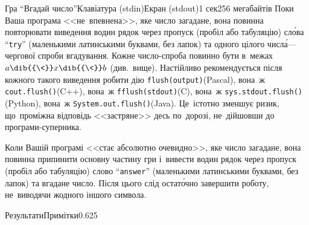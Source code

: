 \begin{problem}{Гра ``Вгадай число''}{Клавіатура (stdin)}{Екран (stdout)}{1 сек}{256 мегабайтів}
\OutputFile
Поки Ваша програма <<не~впевнена>>, яке число загадане,  
вона повинна повторювати виведення 
в\nolinebreak[2] один рядок через пропуск (пробіл або табуляцію) 
сл\'{о}ва ``\texttt{try}'' (маленькими латинськими буквами, без лапок)
та одного цілого числ\'{а}\nolinebreak[3] --- 
чергової спроби вгадування\nolinebreak[3].
Кожне число-спроба повинно бути в~межах $a\dib{{\<}}x\dib{{\<}}b$ (див.~вище).
Настійливо рекомендується після кожного такого виведення 
робити дію \verb"flush(output)"\nolinebreak[2] (Pascal), 
вона~ж \verb"cout.flush()"\nolinebreak[2] (C++), 
вона~ж \verb"fflush(stdout)"\nolinebreak[2] (C), 
вона~ж \verb"sys.stdout.flush()"\nolinebreak[2] (Python),
вона~ж \verb"System.out.flush()"\nolinebreak[2] (Java).
Це~істотно зменшує ризик, 
що~проміжна відповідь <<застряне>> десь по~дорозі, 
не~дійшовши до програми-суперника.

Коли Вашій програмі <<стає абсолютно очевидно>>, яке число загадане,
вона повинна припинити основну частину гри і~вивести 
в\nolinebreak[2] один рядок через пропуск (пробіл або табуляцію) 
слово ``\texttt{answer}'' (маленькими латинськими буквами, без лапок)
та вгадане число. Після цього слід остат\'{о}чно завершити роботу, 
не~виводячи жодного іншого символа.

\Example

\noindent\hspace*{\ifAfour -0.4cm\else -0.5cm\fi}\begin{exampleThreeWithSpecNameColTwoAndLineStretch}{5em}{5em}{\ifAfour 11.8cm\else 11cm\fi}{Результати}{Примітки}{\ifBigStretch -7pt\else -5.5pt\fi}{\ifBigStretch -4pt\else -2pt\fi}{0.625}
%
\end{exampleThreeWithSpecNameColTwoAndLineStretch}

\end{problem}